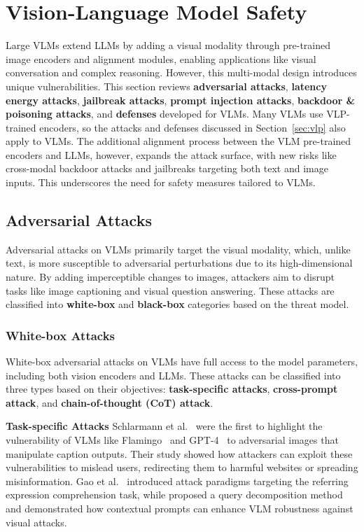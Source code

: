 \section{Vision-Language Model Safety} \label{sec:vlm}

Large VLMs extend LLMs by adding a visual modality through pre-trained image encoders and alignment modules, enabling applications like visual conversation and complex reasoning. However, this multi-modal design introduces unique vulnerabilities.
This section reviews \textbf{adversarial attacks}, \textbf{latency energy attacks}, \textbf{jailbreak attacks}, \textbf{prompt injection attacks}, \textbf{backdoor \& poisoning attacks}, and \textbf{defenses} developed for VLMs. Many VLMs use VLP-trained encoders, so the attacks and defenses discussed in Section~\ref{sec:vlp} also apply to VLMs. The additional alignment process between the VLM pre-trained encoders and LLMs, however, expands the attack surface, with new risks like cross-modal backdoor attacks and jailbreaks targeting both text and image inputs. This underscores the need for safety measures tailored to VLMs.


\subsection{Adversarial Attacks}
\label{sec:vlm-adversarial}
Adversarial attacks on VLMs primarily target the visual modality, which, unlike text, is more susceptible to adversarial perturbations due to its high-dimensional nature. By adding imperceptible changes to images, attackers aim to disrupt tasks like image captioning and visual question answering. These attacks are classified into \textbf{white-box} and \textbf{black-box} categories based on the threat model. 





\subsubsection{White-box Attacks}

White-box adversarial attacks on VLMs have full access to the model parameters, including both vision encoders and LLMs. These attacks can be classified into three types based on their objectives: \textbf{task-specific attacks}, \textbf{cross-prompt attack}, and \textbf{chain-of-thought (CoT) attack}.

\textbf{Task-specific Attacks}  Schlarmann et al.~\cite{schlarmann2023adversarial} were the first to highlight the vulnerability of VLMs like Flamingo~\cite{alayrac2022flamingo} and GPT-4~\cite{gpt-4} to adversarial images that manipulate caption outputs. Their study showed how attackers can exploit these vulnerabilities to mislead users, redirecting them to harmful websites or spreading misinformation. Gao et al.~\cite{gao2024adversarial} introduced attack paradigms targeting the referring expression comprehension task, while \cite{cui2024robustness} proposed a query decomposition method and demonstrated how contextual prompts can enhance VLM robustness against visual attacks.

